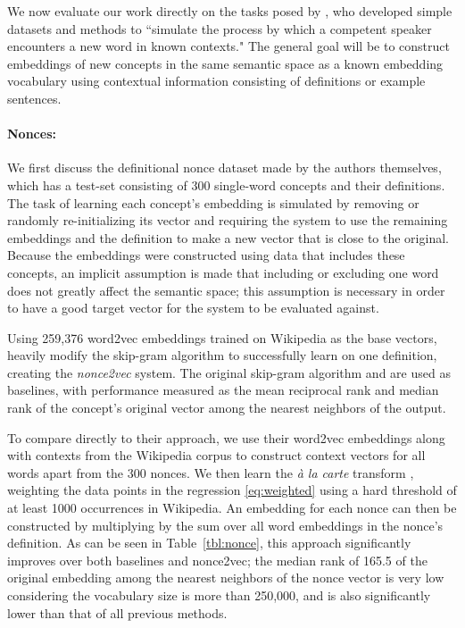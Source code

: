 \documentclass[11pt,a4paper]{article}
\begin{document}
We now evaluate our work directly on the tasks posed by \citet{Herbelot:17}, who developed simple datasets and methods to ``simulate the process by which a competent speaker encounters a new word in known contexts."
The general goal will be to construct embeddings of new concepts in the same semantic space as a known embedding vocabulary using contextual information consisting of definitions or example sentences.

\paragraph{Nonces:}
We first discuss the definitional nonce dataset made by the authors themselves, which has a test-set consisting of 300 single-word concepts and their definitions.
The task of learning each concept's embedding is simulated by removing or randomly re-initializing its vector and requiring the system to use the remaining embeddings and the definition to make a new vector that is close to the original.
Because the embeddings were constructed using data that includes these concepts, an implicit assumption is made that including or excluding one word does not greatly affect the semantic space;
this assumption is necessary in order to have a good target vector for the system to be evaluated against.

Using 259,376 word2vec embeddings trained on Wikipedia as the base vectors, \citet{Herbelot:17} heavily modify the skip-gram algorithm to successfully learn on one definition, creating the {\em nonce2vec} system.
The original skip-gram algorithm and  are used as baselines, with performance measured as the mean reciprocal rank and median rank of the concept's original vector among the nearest neighbors of the output.

To compare directly to their approach, we use their word2vec embeddings along with contexts from the Wikipedia corpus to construct context vectors  for all words  apart from the 300 nonces.
We then learn the {\em\`a la carte} transform , weighting the data points in the regression \eqref{eq:weighted} using a hard threshold of at least 1000 occurrences in Wikipedia. 
An embedding for each nonce can then be constructed by multiplying  by the sum over all word embeddings in the nonce's definition.
As can be seen in Table~\ref{tbl:nonce}, this approach significantly improves over both baselines and nonce2vec; 
the median rank of 165.5 of the original embedding among the nearest neighbors of the nonce vector is very low considering the vocabulary size is more than 250,000, and is also significantly lower than that of all previous methods.
\end{document}
